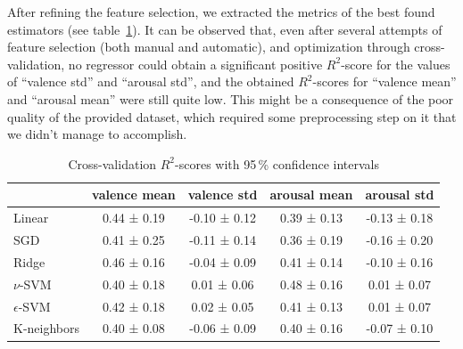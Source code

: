 
After refining the feature selection, we extracted the metrics of the best found estimators (see table~\ref{table:cross-scores}). It can be observed that, even after several attempts of feature selection (both manual and automatic), and optimization through cross-validation, no regressor could obtain a significant positive $R^2$-score for the values of ``valence std'' and ``arousal std'', and the obtained $R^2$-scores for ``valence mean'' and ``arousal mean'' were still quite low. This might be a consequence of the poor quality of the provided dataset, which required some preprocessing step on it that we didn't manage to accomplish.

\begin{table}
	\centering
	\begin{tabular}{lcccc}
		\toprule
		& valence mean & valence std & arousal mean & arousal std \\
		\midrule

		Linear & 0.44 ± 0.19 & -0.10 ± 0.12 & 0.39 ± 0.13 & -0.13 ± 0.18 \\
		SGD & 0.41 ± 0.25 & -0.11 ± 0.14 & 0.36 ± 0.19 & -0.16 ± 0.20 \\
		Ridge & 0.46 ± 0.16 & -0.04 ± 0.09 & 0.41 ± 0.14 & -0.10 ± 0.16 \\

		$\nu$-SVM & 0.40 ± 0.18 & 0.01 ± 0.06 & 0.48 ± 0.16 & 0.01 ± 0.07 \\
		$\epsilon$-SVM & 0.42 ± 0.18 & 0.02 ± 0.05 & 0.41 ± 0.13 & 0.01 ± 0.07 \\

		K-neighbors & 0.40 ± 0.08 & -0.06 ± 0.09 & 0.40 ± 0.16 & -0.07 ± 0.10 \\
		\bottomrule
	\end{tabular}
	\caption{Cross-validation $R^2$-scores with 95\,\% confidence intervals}
	\label{table:cross-scores}
\end{table}

